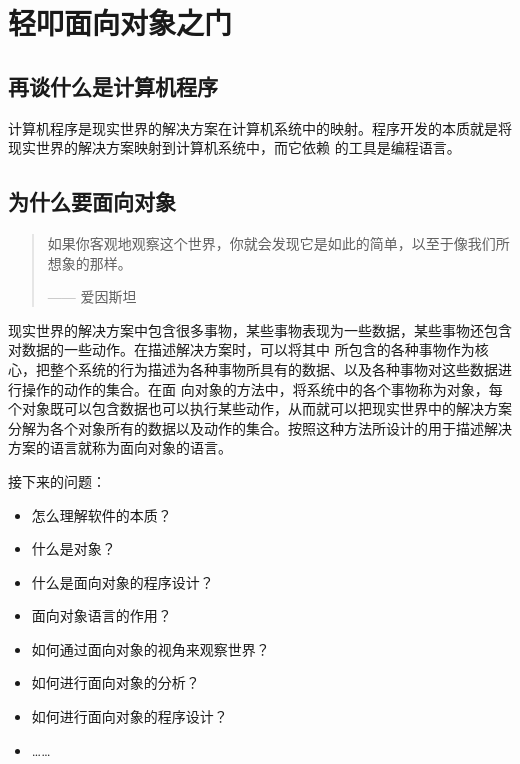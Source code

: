\documentclass[UTF8]{ctexart}
\begin{document}
\section{轻叩面向对象之门}
\subsection{再谈什么是计算机程序}
计算机程序是现实世界的解决方案在计算机系统中的映射。程序开发的本质就是将现实世界的解决方案映射到计算机系统中，而它依赖
的工具是编程语言。
\subsection{为什么要面向对象}
\begin{quote}
    {\kaishu 如果你客观地观察这个世界，你就会发现它是如此的简单，以至于像我们所想象的那样。
    \begin{flushright}
    ------ 爱因斯坦
    \end{flushright}}
\end{quote}
现实世界的解决方案中包含很多事物，某些事物表现为一些数据，某些事物还包含对数据的一些动作。在描述解决方案时，可以将其中
所包含的各种事物作为核心，把整个系统的行为描述为各种事物所具有的数据、以及各种事物对这些数据进行操作的动作的集合。在面
向对象的方法中，将系统中的各个事物称为对象，每个对象既可以包含数据也可以执行某些动作，从而就可以把现实世界中的解决方案
分解为各个对象所有的数据以及动作的集合。按照这种方法所设计的用于描述解决方案的语言就称为面向对象的语言。

接下来的问题：
\begin{itemize}
    \item 怎么理解软件的本质？
    \item 什么是对象？
    \item 什么是面向对象的程序设计？
    \item 面向对象语言的作用？
    \item 如何通过面向对象的视角来观察世界？
    \item 如何进行面向对象的分析？
    \item 如何进行面向对象的程序设计？
    \item ……
\end{itemize}
\end{document}
